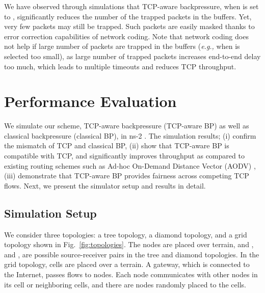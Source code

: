 \documentclass[conference]{IEEEtran}
\newcommand{\eg}{{\em e.g., }}
\begin{document}
We have observed through simulations that TCP-aware backpressure, when  is set to , significantly reduces the number of the trapped packets in the buffers. Yet, very few packets may still be trapped. Such packets are easily masked thanks to error correction capabilities of network coding. Note that network coding does not help if large number of packets are trapped in the buffers (\eg when  is selected too small), as large number of trapped packets increases end-to-end delay too much, which leads to multiple timeouts and reduces TCP throughput.





\section{Performance Evaluation}\label{sec:performance}
We simulate our scheme, TCP-aware backpressure (TCP-aware BP) as well as classical backpressure (classical BP), in ns-2 \cite{ns2}. The simulation results; (i) confirm the mismatch of TCP and classical BP, (ii) show that TCP-aware BP is compatible with TCP, and significantly improves throughput as compared to existing routing schemes such as Ad-hoc On-Demand Distance Vector (AODV) \cite{aodv}, (iii) demonstrate that TCP-aware BP provides fairness across competing TCP flows. Next, we present the simulator setup and results in detail.

\begin{figure*}[t!]
\vspace{-5pt}
\centering
{}
\vspace{-5pt}
\caption{\scriptsize Topologies used in simulations; (a) tree topology, (b) diamond topology, (c) grid topology.}
\vspace{-15pt}
\label{fig:topologies}
\end{figure*}





\subsection{Simulation Setup}
We consider three topologies: a tree topology, a diamond topology, and a grid topology shown in Fig.~\ref{fig:topologies}. The nodes are placed over  terrain, and ,  and ,  are possible source-receiver pairs in the tree and diamond topologies. In the grid topology,  cells are placed over a  terrain. A gateway, which is connected to the Internet, passes flows to nodes. Each node communicates with other nodes in its cell or neighboring cells, and there are  nodes randomly placed to the cells.
\end{document}
